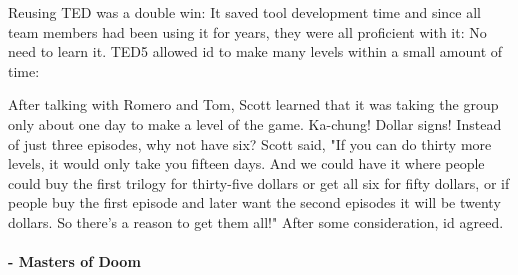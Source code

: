 \documentclass[book.tex]{subfiles}
\begin{document}
Reusing TED was a double win: It saved tool development time and since all team members had been using it for years, they were all proficient with it: No need to learn it. TED5 allowed id to make many levels within a small amount of time:\\
\par

 \begin{fancyquotes}
After talking with Romero and Tom, Scott learned that it was taking the group only about one day to make a level of the game. Ka-chung! Dollar signs! Instead of just three episodes, why not have six? Scott said, "If you can do thirty more levels, it would only take you fifteen days. And we could have it where people could buy the first trilogy for thirty-five dollars or get all six for fifty dollars, or if people buy the first episode and later want the second episodes it will be twenty dollars. So there’s a reason to get them all!" After some consideration, id agreed.\\
\\
 \textbf{- Masters of Doom}
 \end{fancyquotes}\\
\end{document}
